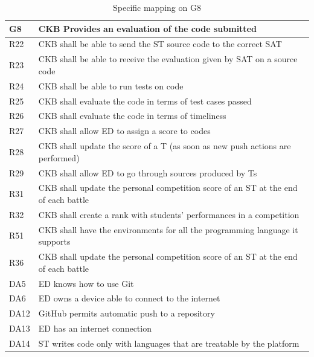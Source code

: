   \begin{table}[H]
    \begin{longtable}{|l|p{12cm}|}
      \hline
      \textbf{G8} & \textbf{CKB Provides an evaluation of the code submitted}      \\
      \hline
      R22 & CKB shall be able to send the ST source code to the correct SAT \\
      \hline
      R23 & CKB shall be able to receive the evaluation given by SAT on a source code \\
      \hline
      R24 & CKB shall be able to run tests on code \\
      \hline
      R25 & CKB shall evaluate the code in terms of test cases passed \\
      \hline
      R26 & CKB shall evaluate the code in terms of timeliness \\
      \hline
      R27 & CKB shall allow ED to assign a score to codes \\
      \hline
      R28 & CKB shall update the score of a T (as soon as new push actions are performed) \\
      \hline
      R29 & CKB shall allow ED to go through sources produced by Ts \\
      \hline
      R31 & CKB shall update the personal competition score of an ST at the end of each battle \\
      \hline
      R32 & CKB shall create a rank with students' performances in a competition \\
      \hline
      R51 & CKB shall have the environments for all the programming language it supports \\
      \hline
      R36 & CKB shall update the personal competition score of an ST at the end of each battle \\
      \hline
      DA5 & ED knows how to use Git \\
      \hline
      DA6 & ED owns a device able to connect to the internet \\
      \hline
      DA12 & GitHub permits automatic push to a repository \\
      \hline
      DA13 & ED has an internet connection \\
      \hline
      DA14 & ST writes code only with languages that are treatable by the platform \\
      \hline
    \end{longtable}
    \caption{Specific mapping on G8}
    \label{tab:mappingG8}
  \end{table}


